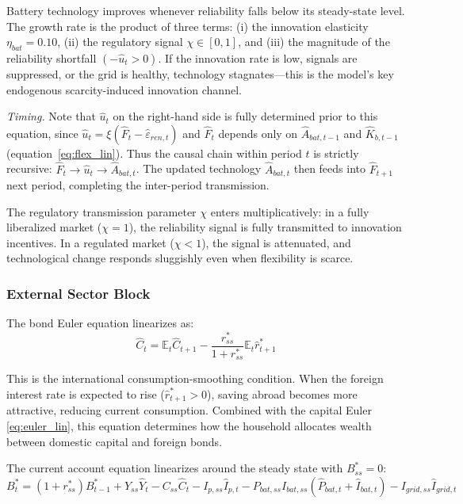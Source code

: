 \documentclass[12pt, a4paper]{article}
\begin{document}
Battery technology improves whenever reliability falls below its steady-state level. The growth rate is the product of three terms: (i) the innovation elasticity $\eta_{bat} = 0.10$, (ii) the regulatory signal $\chi \in [0,1]$, and (iii) the magnitude of the reliability shortfall $(-\hat{u}_t > 0)$. If the innovation rate is low, signals are suppressed, or the grid is healthy, technology stagnates---this is the model's key endogenous scarcity-induced innovation channel.

\noindent \textit{Timing.} Note that $\hat{u}_t$ on the right-hand side is fully determined prior to this equation, since $\hat{u}_t = \xi(\hat{F}_t - \hat{\varepsilon}_{ren,t})$ and $\hat{F}_t$ depends only on $\hat{A}_{bat,t-1}$ and $\hat{K}_{b,t-1}$ (equation~\ref{eq:flex_lin}). Thus the causal chain within period $t$ is strictly recursive: $\hat{F}_t \to \hat{u}_t \to \hat{A}_{bat,t}$. The updated technology $\hat{A}_{bat,t}$ then feeds into $\hat{F}_{t+1}$ next period, completing the inter-period transmission.

The regulatory transmission parameter $\chi$ enters multiplicatively: in a fully liberalized market ($\chi = 1$), the reliability signal is fully transmitted to innovation incentives. In a regulated market ($\chi < 1$), the signal is attenuated, and technological change responds sluggishly even when flexibility is scarce.

\subsubsection{External Sector Block}

The bond Euler equation linearizes as:
\begin{equation}
\hat{C}_t = \mathbb{E}_t \hat{C}_{t+1} - \frac{r^*_{ss}}{1+r^*_{ss}} \mathbb{E}_t \hat{r}^*_{t+1}
\label{eq:bond_euler_lin}
\end{equation}

This is the international consumption-smoothing condition. When the foreign interest rate is expected to rise ($\hat{r}^*_{t+1} > 0$), saving abroad becomes more attractive, reducing current consumption. Combined with the capital Euler \eqref{eq:euler_lin}, this equation determines how the household allocates wealth between domestic capital and foreign bonds.

The current account equation linearizes around the steady state with $B^*_{ss} = 0$:
\begin{equation}
B^*_t = (1 + r^*_{ss}) B^*_{t-1} + Y_{ss}\hat{Y}_t - C_{ss}\hat{C}_t - I_{p,ss}\hat{I}_{p,t} - P_{bat,ss}I_{bat,ss}(\hat{P}_{bat,t} + \hat{I}_{bat,t}) - I_{grid,ss}\hat{I}_{grid,t}
\label{eq:ca_lin}
\end{equation}
\end{document}

